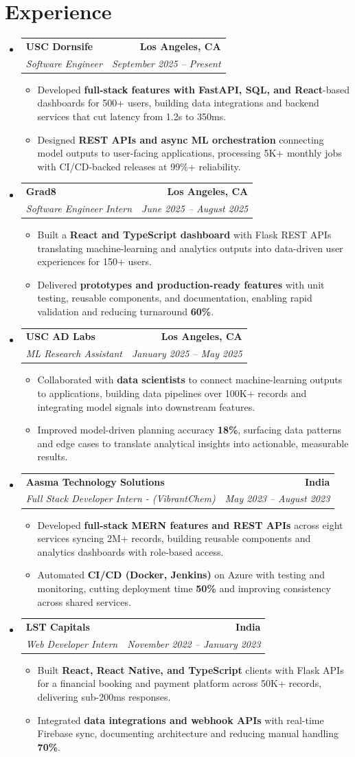 \documentclass[letterpaper,10pt]{article}
\makeatletter
\newcommand{\resumeItem}[1]{\item\small{{#1 \vspace{-2pt}}}}
\newcommand{\resumeSubheading}[4]{\vspace{-1pt}\item\begin{tabular*}{1.0\textwidth}[t]{l@{\extracolsep{\fill}}r}\textbf{#1} & \textbf{\small #2} \\\textit{\small#3} & \textit{\small #4} \\\end{tabular*}\vspace{-2pt}}
\newcommand{\resumeSubHeadingListStart}{\begin{itemize}[leftmargin=0.0in, label={}]}
\newcommand{\resumeSubHeadingListEnd}{\end{itemize}}
\newcommand{\resumeItemListStart}{\begin{itemize}[leftmargin=0.15in,label=\textbullet,itemsep=2pt,topsep=0pt,parsep=0pt,partopsep=0pt]}
\newcommand{\resumeItemListEnd}{\end{itemize}\vspace{-4pt}}
\makeatother
\begin{document}
\section{Experience}
\resumeSubHeadingListStart
\resumeSubheading{USC Dornsife}{Los Angeles, CA}{Software Engineer}{September 2025 -- Present}
\resumeItemListStart
\resumeItem{Developed \textbf{full-stack features with FastAPI, SQL, and React}-based dashboards for 500+ users, building data integrations and backend services that cut latency from 1.2s to 350ms.}
\resumeItem{Designed \textbf{REST APIs and async ML orchestration} connecting model outputs to user-facing applications, processing 5K+ monthly jobs with CI/CD-backed releases at 99\%+ reliability.}
\resumeItemListEnd
\resumeSubheading{Grad8}{Los Angeles, CA}{Software Engineer Intern}{June 2025 -- August 2025}
\resumeItemListStart
\resumeItem{Built a \textbf{React and TypeScript dashboard} with Flask REST APIs translating machine-learning and analytics outputs into data-driven user experiences for 150+ users.}
\resumeItem{Delivered \textbf{prototypes and production-ready features} with unit testing, reusable components, and documentation, enabling rapid validation and reducing turnaround \textbf{60\%}.}
\resumeItemListEnd
\resumeSubheading{USC AD Labs}{Los Angeles, CA}{ML Research Assistant}{January 2025 -- May 2025}
\resumeItemListStart
\resumeItem{Collaborated with \textbf{data scientists} to connect machine-learning outputs to applications, building data pipelines over 100K+ records and integrating model signals into downstream features.}
\resumeItem{Improved model-driven planning accuracy \textbf{18\%}, surfacing data patterns and edge cases to translate analytical insights into actionable, measurable results.}
\resumeItemListEnd
\resumeSubheading{Aasma Technology Solutions}{India}{Full Stack Developer Intern - (VibrantChem)}{May 2023 -- August 2023}
\resumeItemListStart
\resumeItem{Developed \textbf{full-stack MERN features and REST APIs} across eight services syncing 2M+ records, building reusable components and analytics dashboards with role-based access.}
\resumeItem{Automated \textbf{CI/CD (Docker, Jenkins)} on Azure with testing and monitoring, cutting deployment time \textbf{50\%} and improving consistency across shared services.}
\resumeItemListEnd
\resumeSubheading{LST Capitals}{India}{Web Developer Intern}{November 2022 -- January 2023}
\resumeItemListStart
\resumeItem{Built \textbf{React, React Native, and TypeScript} clients with Flask APIs for a financial booking and payment platform across 50K+ records, delivering sub-200ms responses.}
\resumeItem{Integrated \textbf{data integrations and webhook APIs} with real-time Firebase sync, documenting architecture and reducing manual handling \textbf{70\%}.}
\resumeItemListEnd
\resumeSubHeadingListEnd
\vspace{-6pt}
\end{document}
